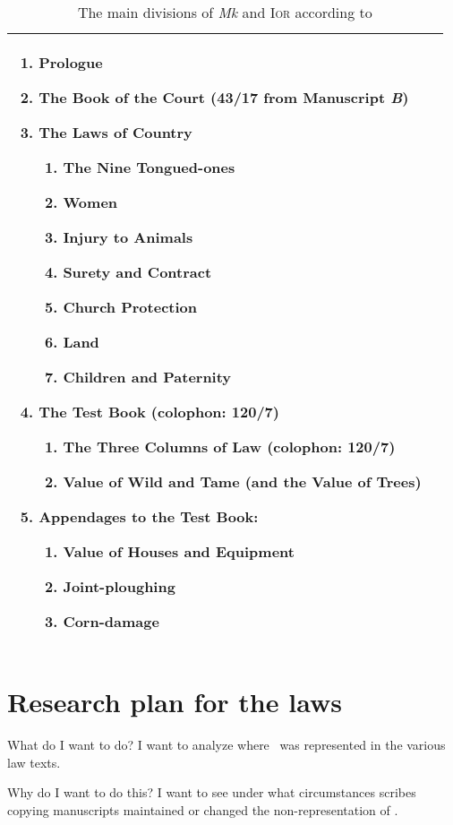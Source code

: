 \begin{table}[h]
\begin{tabular}{@{}p{}p{}@{}}
\begin{enumerate}
\item Prologue
\item The Book of the Court (43/17 from Manuscript \textit{B})
\item The Laws of Country
  \begin{enumerate}
  \item The Nine Tongued-ones
  \item Women
  \item Injury to Animals
  \item Surety and Contract
  \item Church Protection
  \item Land
  \item Children and Paternity
  \end{enumerate}
\item The Test Book (colophon: 120/7)
  \begin{enumerate}
  \item The Three Columns of Law (colophon: 120/7)
  \item Value of Wild and Tame (and the Value of Trees)
  \end{enumerate}
\item Appendages to the Test Book:
  \begin{enumerate}
  \item Value of Houses and Equipment
  \item Joint-ploughing
  \item Corn-damage
  \end{enumerate}
\end{enumerate}\\\bottomrule
\end{tabular}
\caption{The main divisions of \textit{Mk} and \textsc{Ior} according to \textcite[27--28]{charles-edwards_welsh_1989}}
\label{tab:divisions}
\end{table}

\section{Research plan for the laws}
\label{sec:research-plan-laws}

What do I want to do?
I want to analyze where \lT\ was represented in the various law texts.

Why do I want to do this?
I want to see under what circumstances scribes copying manuscripts maintained or changed the non-representation of \lT.

